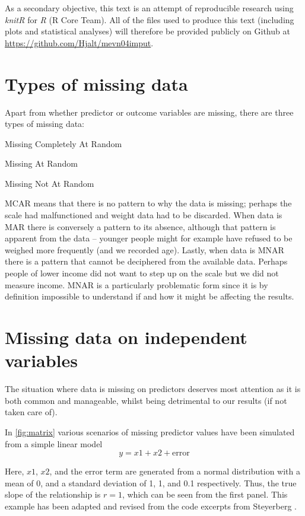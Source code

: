 \documentclass[headinclude=true, headsepline=true, DIV14]{scrartcl}\usepackage[]{graphicx}\usepackage[]{color}
\begin{document}
As a secondary objective, this text is an attempt of reproducible research using
\emph{knitR} for \emph{R} (R Core Team). All of the files used to produce this
text (including plots and statistical analyses) will therefore be provided
publicly on Github at
\href{https://github.com/Hjalt/mevn04imput}{https://github.com/Hjalt/mevn04imput}.

\section{Types of missing data}

Apart from whether predictor or outcome variables are missing, there are 
three types of missing data:

\begin{description}[style=multiline,leftmargin=8ex]
  \item[MCAR] Missing Completely At Random
  \item[MAR] Missing At Random
  \item[MNAR] Missing Not At Random
\end{description}

MCAR means that there is no pattern to why the data is missing; perhaps the 
scale had malfunctioned and weight data had to be discarded. When data is MAR
there is conversely a pattern to its absence, although that pattern is apparent
from the data -- younger people might for example have refused to be weighed more
frequently (and we recorded age). Lastly,
when data is MNAR there is a pattern that cannot be deciphered from
the available data. Perhaps people of lower income did not want to step up on
the scale but we did not measure income. MNAR is a particularly problematic form
since it is by definition impossible to understand if and how it might be
affecting the results.

\section{Missing data on independent variables}

The situation where data is missing on predictors deserves most
attention as it is both common and manageable, whilst being detrimental to our
results (if not taken care of).

In \autoref{fig:matrix} various scenarios of missing predictor values
have been simulated from a simple linear model \[y=x1+x2+\text{error}\]

Here, $x1$, $x2$, and the error term are generated from a normal distribution
with a mean of 0, and a standard deviation of 1, 1, and 0.1 respectively. Thus,
the true slope of the relationship is $r=1$, which can be seen from the first
panel. This example has been adapted and revised from the code excerpts from
Steyerberg \cite{steyerberg_clinical_2009}.
\end{document}
